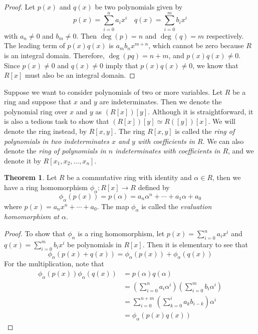 \documentclass[11pt]{book}
\theoremstyle{definition}\newtheorem{definition}[subsection]{Definition}
\theoremstyle{definition}\newtheorem{example}[subsection]{Example}
\theoremstyle{definition}\newtheorem{notation}[subsection]{Notation}
\theoremstyle{definition}\newtheorem{remark}[subsection]{Remark}
\theoremstyle{theorem}\newtheorem{theorem}[subsection]{Theorem}
\theoremstyle{theorem}\newtheorem{lemma}[subsection]{Lemma}
\theoremstyle{theorem}\newtheorem{proposition}[subsection]{Proposition}
\theoremstyle{theorem}\newtheorem{corollary}[subsection]{Corollary}
\begin{document}
\begin{proof}
    Let $p(x)$ and $q(x)$ be two polynomials given by
    \begin{equation*}
        p(x) = \sum_{i = 0}^{n} a_ix^i \quad q(x) = \sum_{i = 0}^{m} b_ix^i
    \end{equation*}
    with $a_n \neq 0$ and $b_m \neq 0$. Then $\deg(p) = n$ and $\deg(q) = m$ respectively. The leading term of $p(x)q(x)$ is $a_mb_nx^{m + n}$, which cannot be zero because $R$ is an integral domain. Therefore, $\deg(pq) = n + m$, and $p(x)q(x) \neq 0$. Since $p(x) \neq 0$ and $q(x) \neq 0$ imply that $p(x)q(x) \neq 0$, we know that $R[x]$ must also be an integral domain.
\end{proof}

Suppose we want to consider polynomials of two or more variables. Let $R$ be a ring and suppose that $x$ and $y$ are indeterminates. Then we denote the polynomial ring over $x$ and $y$ as $(R[x])[y]$. Although it is straightforward, it is also a tedious task to show that $(R[x])[y] \simeq R([y])[x]$. We will denote the ring instead, by $R[x, y]$. The ring $R[x, y]$ is called the \emph{ring of polynomials in two indeterminates $x$ and $y$ with coefficients in $R$}. We can also denote the \emph{ring of polynomials in $n$ indeterminates with coefficients in $R$}, and we denote it by $R[x_1, x_2,..., x_n]$.  

\begin{theorem}\label{theorem:2.1.13}
    Let $R$ be a commutative ring with identity and $\alpha \in R$, then we have a ring homomorphism $\phi_{\alpha} : R[x] \to R$ defined by
    \begin{equation*}
        \phi_{\alpha}(p(x)) = p(\alpha) = a_n\alpha^n + \cdots + a_1\alpha + a_0
    \end{equation*}
    where $p(x) = a_nx^n + \cdots + a_0$. The map $\phi_{\alpha}$ is called the \emph{evaluation homomorphism at $\alpha$}. 
\end{theorem}

\begin{proof}
    To show that $\phi_{\alpha}$ is a ring homomorphism, let $p(x) = \sum_{i = 0}^{n} a_ix^i$ and $q(x) = \sum_{i = 0}^{m} b_ix^i$ be polynomials in $R[x]$. Then it is elementary to see that
    \begin{equation*}
        \phi_{\alpha}(p(x) + q(x)) = \phi_{\alpha}(p(x)) + \phi_{\alpha}(q(x))
    \end{equation*}
    For the multiplication, note that
    \begin{align*}
        \phi_{\alpha}(p(x))\phi_{\alpha}(q(x)) &= p(\alpha)q(\alpha) \\
        &= \left(\sum_{i = 0}^{n} a_i\alpha^i\right)\left(\sum_{i = 0}^{m} b_i\alpha^i\right) \\
        &= \sum_{i = 0}^{n + m} \left(\sum_{k = 0}^{i} a_k b_{i - k}\right) \alpha^i \\
        &= \phi_{\alpha}(p(x)q(x))
    \end{align*}
\end{proof}
\end{document}
